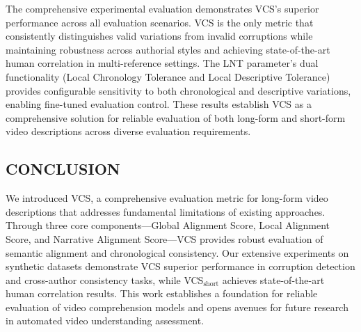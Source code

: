 \documentclass[main.tex]{subfiles}
\begin{document}
The comprehensive experimental evaluation demonstrates VCS's superior performance across all evaluation scenarios. VCS is the only metric that consistently distinguishes valid variations from invalid corruptions while maintaining robustness across authorial styles and achieving state-of-the-art human correlation in multi-reference settings. The LNT parameter's dual functionality (Local Chronology Tolerance and Local Descriptive Tolerance) provides configurable sensitivity to both chronological and descriptive variations, enabling fine-tuned evaluation control. These results establish VCS as a comprehensive solution for reliable evaluation of both long-form and short-form video descriptions across diverse evaluation requirements.

\subsection{CONCLUSION}

We introduced VCS, a comprehensive evaluation metric for long-form video descriptions that addresses fundamental limitations of existing approaches. Through three core components—Global Alignment Score, Local Alignment Score, and Narrative Alignment Score—VCS provides robust evaluation of semantic alignment and chronological consistency. Our extensive experiments on synthetic datasets demonstrate VCS superior performance in corruption detection and cross-author consistency tasks, while VCS$_{\text{short}}$ achieves state-of-the-art human correlation results. This work establishes a foundation for reliable evaluation of video comprehension models and opens avenues for future research in automated video understanding assessment.
\end{document}
